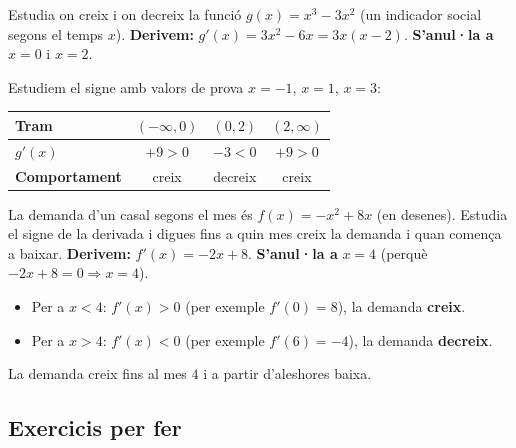 \begin{exresolt}
Estudia on creix i on decreix la funció $g(x)=x^3-3x^2$ (un indicador social segons el
temps $x$).
\solucio
\textbf{Derivem:} $g'(x)=3x^2-6x=3x(x-2)$. \quad \textbf{S'anul·la a} $x=0$ i $x=2$.

Estudiem el signe amb valors de prova $x=-1$, $x=1$, $x=3$:
\begin{center}
\renewcommand{\arraystretch}{1.3}
\begin{tabular}{l c c c}
\toprule
\textbf{Tram} & $(-\infty,0)$ & $(0,2)$ & $(2,\infty)$ \\
\midrule
$g'(x)$ & $+9>0$ & $-3<0$ & $+9>0$ \\
\textbf{Comportament} & creix & decreix & creix \\
\bottomrule
\end{tabular}
\end{center}
\end{exresolt}

\begin{exresolt}
La demanda d'un casal segons el mes és $f(x)=-x^2+8x$ (en desenes). Estudia el signe de
la derivada i digues fins a quin mes creix la demanda i quan comença a baixar.
\solucio
\textbf{Derivem:} $f'(x)=-2x+8$. \quad \textbf{S'anul·la a} $x=4$ (perquè
$-2x+8=0\Rightarrow x=4$).
\begin{itemize}[leftmargin=1.4em, itemsep=2pt]
  \item Per a $x<4$: $f'(x)>0$ (per exemple $f'(0)=8$), la demanda \textbf{creix}.
  \item Per a $x>4$: $f'(x)<0$ (per exemple $f'(6)=-4$), la demanda \textbf{decreix}.
\end{itemize}
La demanda creix fins al mes $4$ i a partir d'aleshores baixa.
\end{exresolt}

\subsection{Exercicis per fer}

